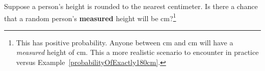 \begin{exercise}
Suppose a person's height is rounded to the nearest centimeter. Is there a chance that a random person's \textbf{measured} height will be  cm?\footnote{This has positive probability. Anyone between  cm and  cm will have a \emph{measured} height of  cm. This a more realistic scenario to encounter in practice versus Example~\ref{probabilityOfExactly180cm}.}
\end{exercise}



